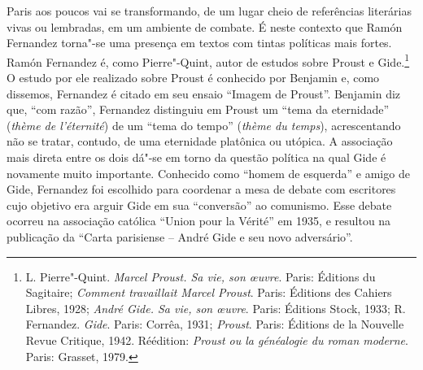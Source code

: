 Paris aos poucos vai se transformando, de um lugar cheio de referências
literárias vivas ou lembradas, em um ambiente de combate. É neste
contexto que Ramón Fernandez torna"-se uma presença em textos com tintas
políticas mais fortes. Ramón Fernandez é, como Pierre"-Quint, autor de
estudos sobre Proust e Gide.\footnote{L. Pierre"-Quint. \emph{Marcel
  Proust. Sa vie, son \oe uvre}. Paris: Éditions du Sagitaire; %
  \emph{Comment travaillait Marcel Proust}. Paris: Éditions des Cahiers Libres,
1928; \emph{André Gide. Sa vie, son \oe uvre}. Paris: Éditions %
  Stock, 1933; R. Fernandez. \emph{Gide}. Paris: Corrêa, 1931;
  \emph{Proust}. Paris: Éditions de la Nouvelle Revue Critique, 1942.
  Réédition: \emph{Proust ou la généalogie du roman moderne}. Paris: Grasset,
  1979.} O estudo por ele realizado sobre Proust é conhecido por
Benjamin e, como dissemos, Fernandez é citado em seu ensaio ``Imagem de
Proust''. Benjamin diz que, ``com razão'', Fernandez distinguiu em
Proust um ``tema da eternidade'' (\emph{thème de l'éternité}) de um
``tema do tempo'' (\emph{thème du temps}), acrescentando não se tratar,
contudo, de uma eternidade platônica ou utópica. A associação mais
direta entre os dois dá"-se em torno da questão política na qual Gide é
novamente muito importante. Conhecido como ``homem de esquerda'' e amigo
de Gide, Fernandez foi escolhido para coordenar a mesa de debate com
escritores cujo objetivo era arguir Gide em sua ``conversão'' ao
comunismo. Esse debate ocorreu na associação católica ``Union pour la
Vérité'' em 1935, e resultou na publicação da ``Carta parisiense  --
André Gide e seu novo adversário''. %

